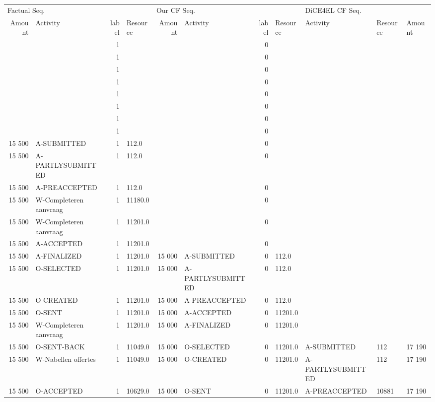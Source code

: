 \begin{tabular}{rlrlrlrllll}
\toprule
\multicolumn{4}{l}{Factual Seq.} & \multicolumn{4}{l}{Our CF Seq.} & \multicolumn{3}{l}{DiCE4EL CF Seq.} \\
Amount & Activity & label & Resource & Amount & Activity & label & Resource & Activity & Resource & Amount \\
\midrule
 &  & 1 &  &  &  & 0 &  &  &  &  \\
 &  & 1 &  &  &  & 0 &  &  &  &  \\
 &  & 1 &  &  &  & 0 &  &  &  &  \\
 &  & 1 &  &  &  & 0 &  &  &  &  \\
 &  & 1 &  &  &  & 0 &  &  &  &  \\
 &  & 1 &  &  &  & 0 &  &  &  &  \\
 &  & 1 &  &  &  & 0 &  &  &  &  \\
 &  & 1 &  &  &  & 0 &  &  &  &  \\
15 500 & A-SUBMITTED & 1 & 112.0 &  &  & 0 &  &  &  &  \\
15 500 & A-PARTLYSUBMITTED & 1 & 112.0 &  &  & 0 &  &  &  &  \\
15 500 & A-PREACCEPTED & 1 & 112.0 &  &  & 0 &  &  &  &  \\
15 500 & W-Completeren aanvraag & 1 & 11180.0 &  &  & 0 &  &  &  &  \\
15 500 & W-Completeren aanvraag & 1 & 11201.0 &  &  & 0 &  &  &  &  \\
15 500 & A-ACCEPTED & 1 & 11201.0 &  &  & 0 &  &  &  &  \\
15 500 & A-FINALIZED & 1 & 11201.0 & 15 000 & A-SUBMITTED & 0 & 112.0 &  &  &  \\
15 500 & O-SELECTED & 1 & 11201.0 & 15 000 & A-PARTLYSUBMITTED & 0 & 112.0 &  &  &  \\
15 500 & O-CREATED & 1 & 11201.0 & 15 000 & A-PREACCEPTED & 0 & 112.0 &  &  &  \\
15 500 & O-SENT & 1 & 11201.0 & 15 000 & A-ACCEPTED & 0 & 11201.0 &  &  &  \\
15 500 & W-Completeren aanvraag & 1 & 11201.0 & 15 000 & A-FINALIZED & 0 & 11201.0 &  &  &  \\
15 500 & O-SENT-BACK & 1 & 11049.0 & 15 000 & O-SELECTED & 0 & 11201.0 & A-SUBMITTED & 112 & 17 190 \\
15 500 & W-Nabellen offertes & 1 & 11049.0 & 15 000 & O-CREATED & 0 & 11201.0 & A-PARTLYSUBMITTED & 112 & 17 190 \\
15 500 & O-ACCEPTED & 1 & 10629.0 & 15 000 & O-SENT & 0 & 11201.0 & A-PREACCEPTED & 10881 & 17 190 \\

\end{tabular}

